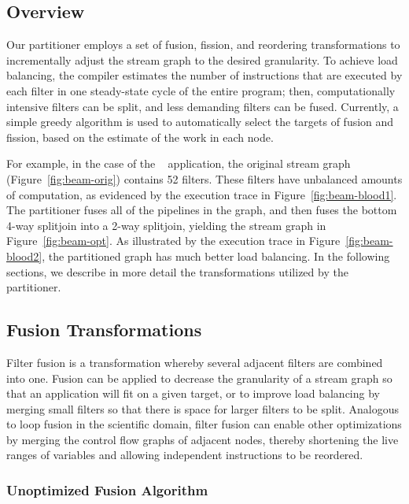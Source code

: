 \subsection{Overview}

Our partitioner employs a set of fusion, fission, and reordering
transformations to incrementally adjust the stream graph to the
desired granularity.  To achieve load balancing, the compiler
estimates the number of instructions that are executed by each filter
in one steady-state cycle of the entire program; then, computationally
intensive filters can be split, and less demanding filters can be
fused.  Currently, a simple greedy algorithm is used to automatically
select the targets of fusion and fission, based on the estimate of the
work in each node.

For example, in the case of the \Radar~ application, the original
stream graph (Figure~\ref{fig:beam-orig}) contains 52 filters.  These
filters have unbalanced amounts of computation, as evidenced by the
execution trace in Figure~\ref{fig:beam-blood1}.  The partitioner
fuses all of the pipelines in the graph, and then fuses the bottom
4-way splitjoin into a 2-way splitjoin, yielding the stream graph in
Figure~\ref{fig:beam-opt}.  As illustrated by the execution trace in
Figure~\ref{fig:beam-blood2}, the partitioned graph has much better
load balancing.  In the following sections, we describe in more detail
the transformations utilized by the partitioner.

\subsection{Fusion Transformations}

Filter fusion is a transformation whereby several adjacent filters are
combined into one.  Fusion can be applied to decrease the granularity
of a stream graph so that an application will fit on a given target,
or to improve load balancing by merging small filters so that there is
space for larger filters to be split.  Analogous to loop fusion in the
scientific domain, filter fusion can enable other optimizations by
merging the control flow graphs of adjacent nodes, thereby shortening
the live ranges of variables and allowing independent instructions to
be reordered.

\subsubsection{Unoptimized Fusion Algorithm}

